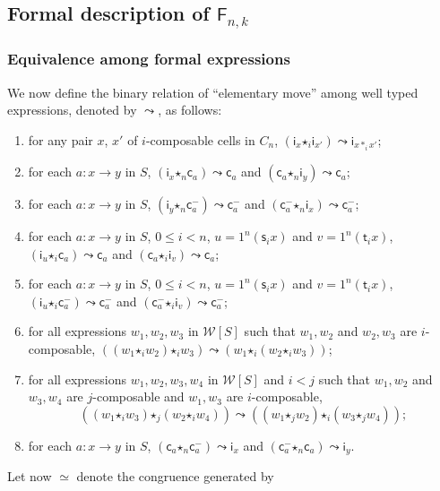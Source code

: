 \documentclass[reqno]{amsart}
\theoremstyle{plain}
\theoremstyle{definition}
\theoremstyle{remark}
\newcommand{\source}{\mathsf{s}} %
\newcommand{\target}{\mathsf{t}} %
\newcommand{\unit}[1]{1^{#1}} %
\newcommand{\functor}[1]{\mathsf{#1}} %
\newcommand{\frf}[1]{\functor{F}_{#1}} %
\newcommand{\comp}[1]{\ast_{#1}} %
\newcommand{\sce}[1]{\source_{#1}} %
\newcommand{\tge}[1]{\target_{#1}} %
\newcommand{\WW}{\mathcal{W}}
\newcommand{\wtx}[1]{\WW[#1]} %
\newcommand{\formal}[1]{\mathsf{#1}} %
\newcommand{\fcst}[1]{\formal{c}_{#1}} %
\newcommand{\finv}[1]{\formal{c}^{\boldsymbol{-}}_{#1}}%
\newcommand{\fid}[1]{\formal{i}_{#1}} %
\newcommand{\fcomp}[1]{\bm{\star}_{#1}} %
\newcommand{\frel}{\leadsto} %
\newcommand{\freq}{\simeq} %
\begin{document}
  
\subsection{Formal description of \texorpdfstring{$\frf{n,k}$}{F(n,k)}}
\label{subsec:congruence}

  
 \subsubsection{Equivalence among formal expressions}\label{ssubsec:eqform}
 We now define the binary relation of ``elementary move'' among well
 typed expressions, denoted by $\frel$, as follows:
\begin{enumerate}[label=\textbf{(e\arabic*)}]
\item\label{ei} for any pair $x$, $x'$ of $i$-composable cells in $C_n$,
  $(\fid{x}\fcomp i\fid{x'})\frel\fid{x\comp i x'} $;
\item\label{eii} for each $a:x\to y$ in $S$, $(\fid{x}\fcomp{n}\fcst{a})\frel
  \fcst{a}$ and $(\fcst a\fcomp{n} \fid{y})\frel \fcst a$;
 \item\label{eiii} for each $a:x\to y$ in $S$, $(\fid{y}\fcomp{n}\finv{a})\frel
   \finv{a}$ and $(\finv a\fcomp{n} \fid{x})\frel \finv a$;
\item\label{eiv} for each $a:x\to y$ in $S$, $0\leq i< n$, $u=\unit n(\sce i
  x)$ and $v=\unit n(\tge i x)$, $(\fid{u}\fcomp{i}\fcst{a})\frel
  \fcst{a}$ and $(\fcst a\fcomp{i} \fid{v})\frel \fcst a$;
\item\label{ev} for each $a:x\to y$ in $S$, $0\leq i< n$, $u=\unit n(\sce i
  x)$ and $v=\unit n(\tge i x)$, $(\fid{u}\fcomp{i}\finv{a})\frel
  \finv{a}$ and $(\finv a\fcomp{i} \fid{v})\frel \finv a$;  
 \item\label{evi} for all expressions $w_1,w_2,w_3$ in $\wtx S$ such that $w_1,w_2$ and
   $w_2,w_3$ are $i$-composable, $((w_1\fcomp i w_2)\fcomp i w_3)\frel
   (w_1\fcomp i(w_2\fcomp i w_3))$;
 \item\label{evii} for all expressions $w_1,w_2,w_3,w_4$ in $\wtx S$ and $i<j$
   such that $w_1,w_2$ and $w_3,w_4$ are
   $j$-composable and $w_1,w_3$ are $i$-composable,
   \[
     ((w_1\fcomp i w_3)\fcomp j (w_2\fcomp i w_4))\frel ((w_1\fcomp j
     w_2)\fcomp i (w_3\fcomp j w_4));
   \]
  \item\label{eviii} for each $a:x\to y$ in $S$, $(\fcst a\fcomp n\finv a)\frel
    \fid{x}$ and $(\finv a\fcomp n\fcst a)\frel \fid y$. 
  \end{enumerate}
  Let now $\freq$ denote the congruence generated by
\end{document}
